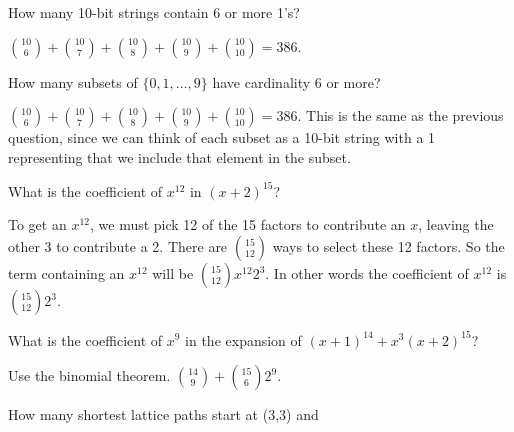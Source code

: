 \begin{questions}
\question How many 10-bit strings contain 6 or more 1's?

  \begin{answer}
    ${10 \choose 6} + {10\choose 7} + {10\choose 8} + {10 \choose 9} + {10\choose 10} = 386$.
  \end{answer}

\question How many subsets of $\{0,1,\ldots, 9\}$ have cardinality 6 or more?

	\begin{answer}
	${10 \choose 6} + {10\choose 7} + {10\choose 8} + {10 \choose 9} + {10\choose 10} = 386$.  This is the same as the previous question, since we can think of each subset as a 10-bit string with a 1 representing that we include that element in the subset.
	\end{answer}



\question What is the coefficient of $x^{12}$ in $(x+2)^{15}$?

	\begin{answer}
		To get an $x^{12}$, we must pick 12 of the 15 factors to contribute an $x$, leaving the other 3 to contribute a 2.  There are ${15 \choose 12}$ ways to select these 12 factors.  So the term containing an $x^{12}$ will be ${15 \choose 12}x^{12}2^{3}$.  In other words the coefficient of $x^{12}$ is ${15\choose 12}2^3$.
	\end{answer}



\question What is the coefficient of $x^9$ in the expansion of $(x+1)^{14} + x^3(x+2)^{15}$?

  \begin{answer}
    Use the binomial theorem.  ${14\choose 9} + {15 \choose 6}2^9$.
  \end{answer}




   
\question How many shortest lattice paths start at (3,3) and


\end{questions}
